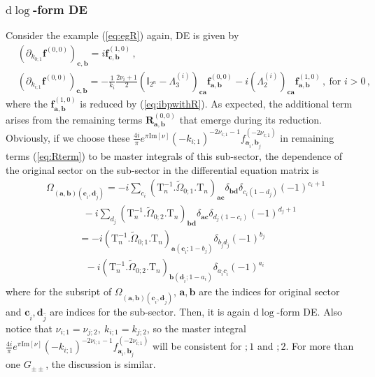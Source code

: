 \documentclass[a4paper,11pt]{article}
\newcommand{\nn}{\nonumber}
\newcommand{\nd}{\mathrm{d}}
\def\eqref#1{(\ref{#1})}
\begin{document}
\subsubsection{$\nd \log$-form DE}
Consider the example \eqref{eq:egR} again, DE is given by
\begin{align}
&\left(\partial_{k_{0;1}}\bm{f}^{(0,0)}\right)_{\bm{c},\bm{b}}=i \bm{f}^{(1,0)}_{\bm{c},\bm{b}}   \,, \nn\\
&\left(\partial_{k_{i;1}}\bm{f}^{(0,0)}\right)_{\bm{c},\bm{b}} =  - \frac{1}{ k_i}\frac{2\nu_i+1}{2}\left(\mathbb{I}_{2^n} - \Lambda_3^{(i)}\right)_{\bm{c}\bm{a}}\bm{f}^{(0,0)}_{\bm{a},\bm{b}}-i  \left(\Lambda_2^{(i)}\right)_{\bm{c}\bm{a}} \bm{f}^{(1,0)}_{\bm{a},\bm{b}}\, , ~\text{for $i>0$}  \, ,  \label{eq:nDE11}
\end{align}
where the $\bm{f}^{(1,0)}_{\bm{a},\bm{b}}$ is reduced  by \eqref{eq:ibpwithR}. As expected, the additional term arises from the remaining terms $\bm{R}_{\bm{a},\bm{b}}^{(0,0)}$ that emerge during its reduction. Obviously, if we choose these $\frac{4i}{\pi} e^{ \pi \text{Im}[\nu]} (-k_{i;1})^{-2\nu_{i;1}-1} f^{(-2\nu_{i;1})}_{\bm{a}_{\hat{i}},\bm{b}_{\hat{j}} }$ in remaining terms \eqref{eq:Rterm}  to be master integrals of this sub-sector, the dependence of the original sector on  the sub-sector in the differential equation matrix is
\begin{align}
 &\Omega_{({\bm{a},\bm{b}})(\bm{c}_{\hat{i}},\bm{d}_{\hat{j}})} =- i  \sum_{c_i}\left( \text{T}_n^{-1}.  \tilde{\Omega}_{0;1}.\text{T}_n \right)_{\bm{a}\bm{c}} \delta_{\bm{b}\bm{d}} \delta_{c_i(1-d_j)} (-1)^{c_i+1} \nn\\
&~~~~~~~~~~~~~~~~~ - i \sum_{d_j} \left( \text{T}_n^{-1}.  \tilde{\Omega}_{0;2}.\text{T}_n \right)_{\bm{b}\bm{d}} \delta_{\bm{a}\bm{c}} \delta_{d_j(1-c_i)}  (-1)^{d_j+1} \nn\\
&~~~~~~~~~~~~~~~ =- i \left( \text{T}_n^{-1}.  \tilde{\Omega}_{0;1}.\text{T}_n \right)_{\bm{a}(\bm{c}_{\hat i};1-b_j)} \delta_{b_{\hat j}d_{\hat j}} (-1)^{b_j}  \nn\\
&~~~~~~~~~~~~~~~~~~ -  i \left( \text{T}_n^{-1}.  \tilde{\Omega}_{0;2}.\text{T}_n \right)_{\bm{b}(\bm{d}_{\hat i};1-a_i)} \delta_{a_{\hat i}c_{\hat i}} (-1)^{a_i}
\end{align}  
where for the subsript of $\Omega_{({\bm{a},\bm{b}})(\bm{c}_{\hat{i}},\bm{d}_{\hat{j}})}$,  ${\bm{a},\bm{b}}$ are the indices for original sector and $\bm{c}_{\hat{i}},\bm{d}_{\hat{j}}$ are indices for the sub-sector.
Then, it is again $\nd \log$-form DE. Also notice that $\nu_{i;1}=\nu_{j;2}, \ k_{i;1}=k_{j;2}$, so the master integral $\frac{4i}{\pi}  e^{ \pi \text{Im}[\nu]} (-k_{i;1})^{-2\nu_{i;1}-1} f^{(-2\nu_{i;1})}_{\bm{a}_{\hat{i}},\bm{b}_{\hat{j}} }$  will be consistent for $;1$ and $;2$. For more than one $G_{\pm\pm}$, the discussion is similar.
\end{document}
